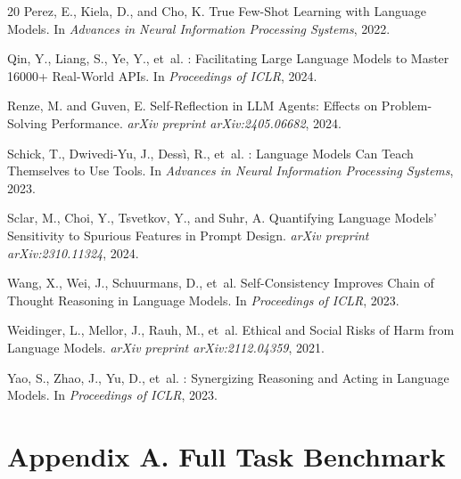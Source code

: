 \documentclass[letterpaper]{article}
\begin{document}
\begin{thebibliography}{20}
Perez, E., Kiela, D., and Cho, K.
\newblock True Few-Shot Learning with Language Models.
\newblock In \textit{Advances in Neural Information Processing Systems}, 2022.

Qin, Y., Liang, S., Ye, Y., et~al.
: Facilitating Large Language Models to Master 16000+
  Real-World {APIs}.
\newblock In \textit{Proceedings of ICLR}, 2024.

Renze, M. and Guven, E.
\newblock Self-Reflection in {LLM} Agents: Effects on Problem-Solving
  Performance.
\newblock \textit{arXiv preprint arXiv:2405.06682}, 2024.

Schick, T., Dwivedi-Yu, J., Dess{\`i}, R., et~al.
: Language Models Can Teach Themselves to Use Tools.
\newblock In \textit{Advances in Neural Information Processing Systems}, 2023.

Sclar, M., Choi, Y., Tsvetkov, Y., and Suhr, A.
\newblock Quantifying Language Models' Sensitivity to Spurious Features in
  Prompt Design.
\newblock \textit{arXiv preprint arXiv:2310.11324}, 2024.

Wang, X., Wei, J., Schuurmans, D., et~al.
\newblock Self-Consistency Improves Chain of Thought Reasoning in Language
  Models.
\newblock In \textit{Proceedings of ICLR}, 2023.

Weidinger, L., Mellor, J., Rauh, M., et~al.
\newblock Ethical and Social Risks of Harm from Language Models.
\newblock \textit{arXiv preprint arXiv:2112.04359}, 2021.

Yao, S., Zhao, J., Yu, D., et~al.
: Synergizing Reasoning and Acting in Language Models.
\newblock In \textit{Proceedings of ICLR}, 2023.

\end{thebibliography}

\appendix

\clearpage
\section*{Appendix A. Full Task Benchmark}
\label{app:tasks}
\end{document}
